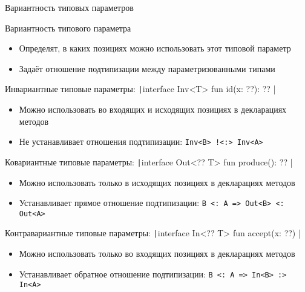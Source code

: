 \documentclass[handout,aspectratio=169,usenames,dvipsnames]{beamer}
\begin{document}
\begin{frame}[fragile]{Вариантность типовых параметров}
    \begin{block}{Вариантность типового параметра}
        \begin{itemize}
            \item Определят, в каких позициях можно использовать этот типовой параметр
            \item Задаёт отношение подтипизации между параметризованными типами
        \end{itemize}
    \end{block}

    \pause
    \begin{block}{Инвариантные типовые параметры: \texttt|interface Inv<T> { fun id(x: ??): ?? }|}
        \begin{itemize}
            \item Можно использовать во входящих и исходящих позициях в декларациях методов
            \item Не устанавливает отношения подтипизации: \texttt{Inv<B> !<:> Inv<A>}
        \end{itemize}
    \end{block}

    \pause
    \begin{block}{Ковариантные типовые параметры: \texttt|interface Out<?? T> { fun produce(): ?? }|}
        \begin{itemize}
            \item Можно использовать только в исходящих позициях в декларациях методов
            \item Устанавливает прямое отношение подтипизации: \texttt{B <: A => Out<B> <: Out<A>}
        \end{itemize}
    \end{block}

    \pause
    \begin{block}{Контравариантные типовые параметры: \texttt|interface In<?? T> { fun accept(x: ??) }|}
        \begin{itemize}
            \item Можно использовать только во входящих позициях в декларациях методов
            \item Устанавливает обратное отношение подтипизации: \texttt{B <: A => In<B> :> In<A>}
        \end{itemize}
    \end{block}
\end{frame}
\end{document}
